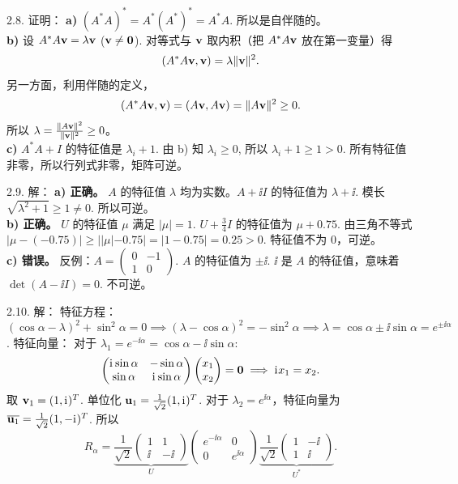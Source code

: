 \begin{exer}
2.8. 证明：
\textbf{a)} $(A^*A)^* = A^* (A^*)^* = A^* A$. 所以是自伴随的。\\
\textbf{b)} 设 $A^*A \mathbf{v} = \lambda \mathbf{v}$ ($\mathbf{v} \neq \mathbf{0}$).
对等式与 $\mathbf{v}$ 取内积（把 $A^*A\mathbf{v}$ 放在第一变量）得
$$(A^*A\mathbf{v},\mathbf{v})=\lambda\|\mathbf{v}\|^2.$$
另一方面，利用伴随的定义，
$$(A^*A\mathbf{v},\mathbf{v})=(A\mathbf{v},A\mathbf{v})=\|A\mathbf{v}\|^2\ge0.$$
所以 $\lambda = \frac{\|A\mathbf{v}\|^2}{\|\mathbf{v}\|^2} \ge 0$。\\
\textbf{c)} $A^*A+I$ 的特征值是 $\lambda_i + 1$.
由 b) 知 $\lambda_i \ge 0$, 所以 $\lambda_i + 1 \ge 1 > 0$.
所有特征值非零，所以行列式非零，矩阵可逆。

2.9. 解：
\textbf{a) 正确。} $A$ 的特征值 $\lambda$ 均为实数。$A+\ii I$ 的特征值为 $\lambda + \ii$. 模长 $\sqrt{\lambda^2+1} \ge 1 \neq 0$. 所以可逆。\\
\textbf{b) 正确。} $U$ 的特征值 $\mu$ 满足 $|\mu|=1$. $U + \frac{3}{4}I$ 的特征值为 $\mu + 0.75$. 由三角不等式 $|\mu - (-0.75)| \ge ||\mu| - 0.75| = |1 - 0.75| = 0.25 > 0$. 特征值不为 0，可逆。\\
\textbf{c) 错误。} 反例：$A = \begin{pmatrix} 0 & -1 \\ 1 & 0 \end{pmatrix}$. $A$ 的特征值为 $\pm \ii$. $\ii$ 是 $A$ 的特征值，意味着 $\det(A - \ii I) = 0$. 不可逆。

2.10. 解：
特征方程：$(\cos\alpha - \lambda)^2 + \sin^2\alpha = 0 \implies (\lambda - \cos\alpha)^2 = -\sin^2\alpha \implies \lambda = \cos\alpha \pm \ii\sin\alpha = e^{\pm \ii\alpha}$.
特征向量：
对于 $\lambda_1 = e^{-\ii\alpha} = \cos\alpha - \ii\sin\alpha$:
$$ \begin{pmatrix} \mathrm{i}\mkern1mu\sin\alpha & -\sin\alpha \\ \sin\alpha & \mathrm{i}\mkern1mu\sin\alpha \end{pmatrix} \begin{pmatrix} x_1 \\ x_2 \end{pmatrix} = \mathbf{0} \implies \mathrm{i}\mkern1mu x_1 = x_2. $$
取 $\mathbf{v}_1 = (1, \mathrm{i}\mkern1mu)^T$. 单位化 $\mathbf{u}_1 = \frac{1}{\sqrt{2}} (1, \mathrm{i}\mkern1mu)^T$.
对于 $\lambda_2 = e^{\ii\alpha}$，特征向量为 $\overline{\mathbf{u}_1} = \frac{1}{\sqrt{2}} (1, -\mathrm{i}\mkern1mu)^T$.
所以
$$ R_\alpha = \underbrace{\frac{1}{\sqrt{2}} \begin{pmatrix} 1 & 1 \\ \ii & -\ii \end{pmatrix}}_{U} \begin{pmatrix} e^{-\ii\alpha} & 0 \\ 0 & e^{\ii\alpha} \end{pmatrix} \underbrace{\frac{1}{\sqrt{2}} \begin{pmatrix} 1 & -\ii \\ 1 & \ii \end{pmatrix}}_{U^*}. $$


\end{exer}
